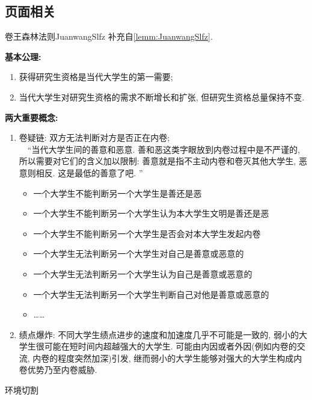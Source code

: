 \documentclass[hyperref,UTF8,11pt,CJK,handout]{beamer}
\begin{document}
\subsection{页面相关}
\begin{lrbox}{\mysavebox}
	\begin{scuremark}{卷王森林法则}{JuanwangSlfz}
		补充自\vref{lemm:JuanwangSlfz}.\par
		\textbf{\color{JXred}基本公理:}
		\begin{enumerate}
			\item 获得研究生资格是当代大学生的第一需要;
			\item 当代大学生对研究生资格的需求不断增长和扩张, 但研究生资格总量保持不变.
		\end{enumerate}
		\textbf{\color{JXred}两大重要概念:}
		\begin{enumerate}
			\item 卷疑链: 双方无法判断对方是否正在内卷;\\
			~~“当代大学生间的善意和恶意. 善和恶这类字眼放到内卷过程中是不严谨的, 所以需要对它们的含义加以限制: 善意就是指不主动内卷和卷灭其他大学生, 恶意则相反. 这是最低的善意了吧. ”
			\begin{itemize}
				\item 一个大学生不能判断另一个大学生是善还是恶
				\item 一个大学生不能判断另一个大学生认为本大学生文明是善还是恶
				\item 一个大学生不能判断另一个大学生是否会对本大学生发起内卷
				\item 一个大学生无法判断另一个大学生对自己是善意或恶意的
				\item 一个大学生无法判断另一个大学生认为自己是善意或恶意的
				\item 一个大学生无法判断另一个大学生判断自己对他是善意或恶意的
				\item \dots\dots
			\end{itemize}	
			\item 绩点爆炸: 不同大学生绩点进步的速度和加速度几乎不可能是一致的, 弱小的大学生很可能在短时间内超越强大的大学生. 可能由内因或者外因(例如内卷的交流, 内卷的程度突然加深)引发, 继而弱小的大学生能够对强大的大学生构成内卷优势乃至内卷威胁.
		\end{enumerate}
	\end{scuremark}
\end{lrbox}
\begin{frame}{环境切割}
\end{frame}
\end{document}
